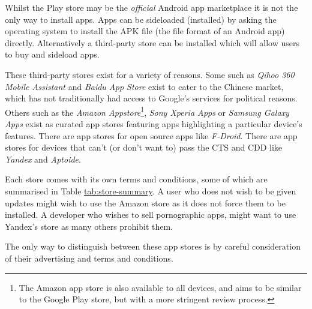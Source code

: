 \documentclass[thesis.tex]{subfiles}
\begin{document}
Whilst the Play store may be the \emph{official} Android app marketplace
it is not the only way to install apps. Apps can be sideloaded
(installed) by asking the operating system to install the APK file (the
file format of an Android app) directly. Alternatively a third-party
store can be installed which will allow users to buy and sideload apps.

These third-party stores exist for a variety of reasons. Some such as
\emph{Qihoo 360 Mobile Assistant} and \emph{Baidu App Store} exist to cater to
the Chinese market, which has not traditionally had access to Google's services
for political reasons. Others such as the \emph{Amazon Appstore}\footnote{The
Amazon app store is also available to all devices, and aims to be similar to the
Google Play store, but with a more stringent review process.}, \emph{Sony Xperia
Apps} or \emph{Samsung Galaxy Apps} exist as curated app stores featuring apps
highlighting a particular device's features. There are app stores for open
source apps like \emph{F-Droid}. There are app stores for devices that can't (or
don't want to) pass the CTS and CDD like \emph{Yandex} and \emph{Aptoide}.

Each store comes with its own terms and conditions, some of which are
summarised in Table \url{tab:store-summary}. A user who does not wish to
be given updates might wish to use the Amazon store as it does not force
them to be installed. A developer who wishes to sell pornographic apps,
might want to use Yandex's store as many others prohibit them.

The only way to distinguish between these app stores is by
careful consideration of their advertising and terms and conditions.
\end{document}

